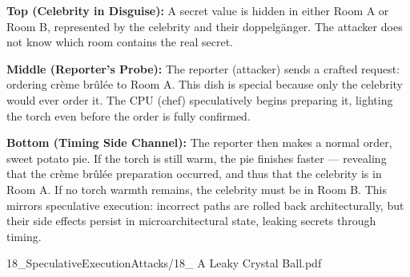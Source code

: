 \begin{SideNotePage}{
  \textbf{Top (Celebrity in Disguise):} A secret value is hidden in either Room A or Room B, represented by the celebrity and their doppelgänger. The attacker does not know which room contains the real secret. \par
  \textbf{Middle (Reporter’s Probe):} The reporter (attacker) sends a crafted request: ordering crème brûlée to Room A. This dish is special because only the celebrity would ever order it. The CPU (chef) speculatively begins preparing it, lighting the torch even before the order is fully confirmed. \par
  \textbf{Bottom (Timing Side Channel):} The reporter then makes a normal order, sweet potato pie. If the torch is still warm, the pie finishes faster — revealing that the crème brûlée preparation occurred, and thus that the celebrity is in Room A. If no torch warmth remains, the celebrity must be in Room B. This mirrors speculative execution: incorrect paths are rolled back architecturally, but their side effects persist in microarchitectural state, leaking secrets through timing. \par

}{18_SpeculativeExecutionAttacks/18_ A Leaky Crystal Ball.pdf}
\end{SideNotePage}
